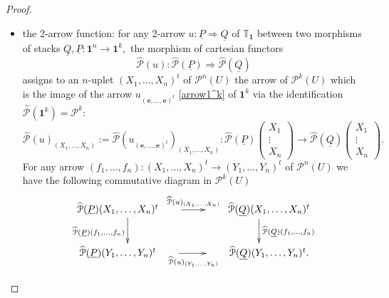 \documentclass[11pt]{amsart}
\newcommand{\cP}{\mathcal{P}}
\newcommand{\bfu}{\textbf{1}}
\newcommand{\twoT}{\mathbb{T}}
\theoremstyle{definition}
\numberwithin{equation}{section}
\begin{document}
\begin{proof}
\begin{itemize}
\begin{itemize}
 	\end{itemize}
 	\item the 2-arrow function: for any 2-arrow $u: \underline{P} \Rightarrow \underline{Q}$ of $\twoT_\bfu$ between two morphisms of stacks $\underline {Q}, \underline{P}: \bfu^n \to \bfu^k,$ the morphism of cartesian functors 
 		$$\widehat{\cP}(u):\widehat{\cP}(\underline{P}) \Longrightarrow \widehat{\cP}(\underline{Q} )$$
 		assigns to an $n$-uplet $(X_1, \dots, X_n)^t$ of $\cP^n(U)$ the arrow of $\cP^k(U)$ which is the image of the arrow $u_{(\mathbf{e}, \dots, \mathbf{e})^t}$ \eqref{arrow1^k} of $\bfu^k$ via the identification $\widehat{\cP}(\bfu^k)= \cP^k$:
 		\[\widehat{\cP}(u)_{(X_1, \dots, X_n)} := \widehat{\cP}(u_{(\mathbf{e}, \dots, \mathbf{e})^t})_{(X_1, \dots, X_n)}
 		 : \widehat{\cP}(\underline{P}) \left(\begin{matrix} X_1 \\ \vdots \\ X_n\end{matrix}\right) \longrightarrow \widehat{\cP}(\underline{Q}) \left(\begin{matrix} X_1 \\ \vdots \\ X_n\end{matrix}\right).  \]
 		For any arrow $(f_1, \dots, f_n): (X_1, \dots, X_n)^t \to (Y_1, \dots, Y_n)^t$ of $\cP^n(U)$ we have the following commutative diagram in $\cP^k(U)$
 	\begin{equation*}
 	\begin{tabular}{c}
 		\xymatrix{  \widehat{\cP}(\underline{P})(X_1, \dots, X_n)^t \ar[r]^{\widehat{\cP}(u)_{(X_1, \dots, X_n)}} \ar[d]_{\widehat{\cP}(\underline{P}) (f_1, \dots, f_n)} \qquad &  \qquad \widehat{\cP}(\underline{Q})(X_1, \dots, X_n)^t \ar[d]^{\widehat{\cP}(\underline{Q}) (f_1, \dots, f_n)} \\ 
 			\widehat{\cP}(\underline{P})(Y_1, \dots, Y_n)^t \ar[r]_{\widehat{\cP}(u)_{(Y_1, \dots, Y_n)}} \qquad & \qquad   \widehat{\cP}(\underline{Q})(Y_1, \dots, Y_n)^t.}
 	\end{tabular}
 \end{equation*}
 \end{itemize} 

		
	

\end{proof}
\end{document}
